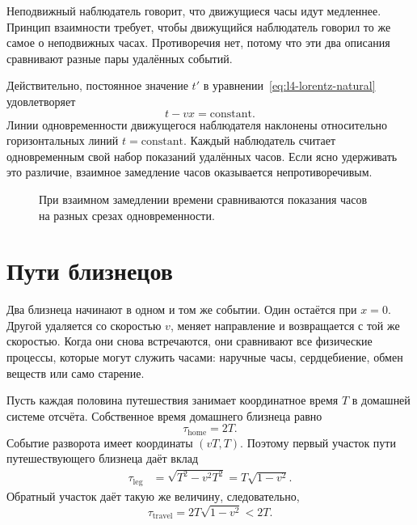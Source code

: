 Неподвижный наблюдатель говорит, что движущиеся часы идут медленнее. Принцип взаимности требует, чтобы движущийся наблюдатель говорил то же самое о неподвижных часах. Противоречия нет, потому что эти два описания сравнивают разные пары удалённых событий.

Действительно, постоянное значение $t'$ в уравнении~\eqref{eq:l4-lorentz-natural} удовлетворяет
\begin{equation}
t-vx=\text{constant}.
\label{eq:l4-simultaneity}
\end{equation}
Линии одновременности движущегося наблюдателя наклонены относительно горизонтальных линий $t=\text{constant}$. Каждый наблюдатель считает одновременным свой набор показаний удалённых часов. Если ясно удерживать это различие, взаимное замедление часов оказывается непротиворечивым.

\begin{figure}[H]
\centering
{}
\caption{При взаимном замедлении времени сравниваются показания часов на разных срезах одновременности.}
\end{figure}

\section{Пути близнецов}

Два близнеца начинают в одном и том же событии. Один остаётся при $x=0$. Другой удаляется со скоростью $v$, меняет направление и возвращается с той же скоростью. Когда они снова встречаются, они сравнивают все физические процессы, которые могут служить часами: наручные часы, сердцебиение, обмен веществ или само старение.

Пусть каждая половина путешествия занимает координатное время $T$ в домашней системе отсчёта. Собственное время домашнего близнеца равно
\begin{equation}
\tau_{\mathrm{home}}=2T.
\end{equation}
Событие разворота имеет координаты $(vT,T)$. Поэтому первый участок пути путешествующего близнеца даёт вклад
\begin{align}
\tau_{\mathrm{leg}}
&=\sqrt{T^2-v^2T^2}
=T\sqrt{1-v^2}.
\end{align}
Обратный участок даёт такую же величину, следовательно,
\begin{equation}
\tau_{\mathrm{travel}}=2T\sqrt{1-v^2}<2T.
\label{eq:l4-twin}
\end{equation}

